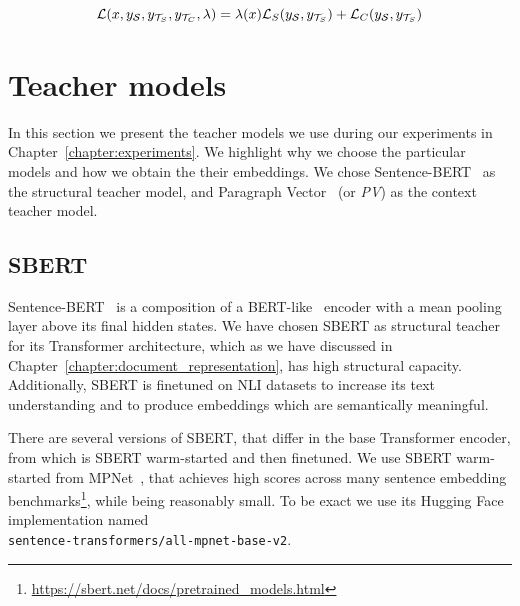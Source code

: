 \begin{equation}\label{eq:abstract_loss}
  \mathcal{L}(
    x,
    y_{\mathcal{S}},
    y_{\mathcal{T}_S},
    y_{\mathcal{T}_C},
    \lambda
  ) =
    \lambda(x) \mathcal{L}_S(y_{\mathcal{S}}, y_{\mathcal{T}_S}) +
            \mathcal{L}_C(y_{\mathcal{S}}, y_{\mathcal{T}_S})
\end{equation}

\section{Teacher models}\label{section:teacher_models}


In this section we present the teacher models we use during our experiments in
Chapter~\ref{chapter:experiments}. We highlight why we choose the particular
models and how we obtain the their embeddings. We chose
Sentence-BERT~\citep{reimers2020making} as the structural teacher model, and
Paragraph Vector~\citep{le2014distributed} (or \emph{PV}) as the context teacher
model.

\subsection{SBERT}

Sentence-BERT~\citep{reimers2019sentence} is a composition of a
BERT-like~\citep{devlin2019bert} encoder with a mean pooling layer above its
final hidden states. We have chosen SBERT as structural teacher for its
Transformer architecture, which as we have discussed in
Chapter~\ref{chapter:document_representation}, has high structural capacity.
Additionally, SBERT is finetuned on NLI datasets to increase its text
understanding and to produce embeddings which are semantically meaningful.

There are several versions of SBERT, that differ in the base Transformer
encoder, from which is SBERT warm-started and then finetuned. We use SBERT
warm-started from MPNet~\citep{song2020mpnet}, that achieves high scores across
many sentence embedding
benchmarks\footnote{\url{https://sbert.net/docs/pretrained_models.html}}, while
being reasonably small. To be exact we use its Hugging Face implementation
named \\ \texttt{sentence-transformers/all-mpnet-base-v2}.

